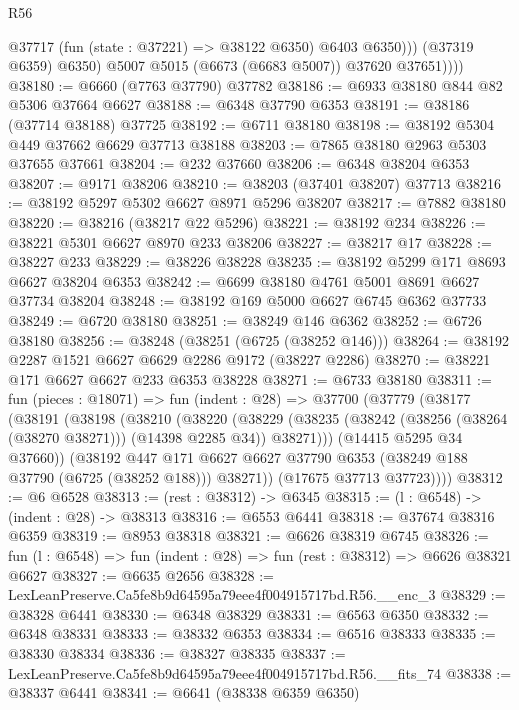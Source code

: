 \begin{lexlean}{R56}
\begin{coremodule}
                  @37717 (fun (state : @37221) => @38122 @6350) @6403 @6350)))
              (@37319 @6359)
              @6350)
            @5007
            @5015
            (@6673 (@6683 @5007))
            @37620
            @37651))))
@38180 := @6660 (@7763 @37790) @37782
@38186 := @6933 @38180 @844 @82 @5306 @37664 @6627
@38188 := @6348 @37790 @6353
@38191 := @38186 (@37714 @38188) @37725
@38192 := @6711 @38180
@38198 := @38192 @5304 @449 @37662 @6629 @37713 @38188
@38203 := @7865 @38180 @2963 @5303 @37655 @37661
@38204 := @232 @37660
@38206 := @6348 @38204 @6353
@38207 := @9171 @38206
@38210 := @38203 (@37401 @38207) @37713
@38216 := @38192 @5297 @5302 @6627 @8971 @5296 @38207
@38217 := @7882 @38180
@38220 := @38216 (@38217 @22 @5296)
@38221 := @38192 @234
@38226 := @38221 @5301 @6627 @8970 @233 @38206
@38227 := @38217 @17
@38228 := @38227 @233
@38229 := @38226 @38228
@38235 := @38192 @5299 @171 @8693 @6627 @38204 @6353
@38242 := @6699 @38180 @4761 @5001 @8691 @6627 @37734 @38204
@38248 := @38192 @169 @5000 @6627 @6745 @6362 @37733
@38249 := @6720 @38180
@38251 := @38249 @146 @6362
@38252 := @6726 @38180
@38256 := @38248 (@38251 (@6725 (@38252 @146)))
@38264 := @38192 @2287 @1521 @6627 @6629 @2286 @9172 (@38227 @2286)
@38270 := @38221 @171 @6627 @6627 @233 @6353 @38228
@38271 := @6733 @38180
@38311 := fun (pieces : @18071) =>
  fun (indent : @28) =>
  @37700
    (@37779
      (@38177
        (@38191
          (@38198
            (@38210
              (@38220
                (@38229
                  (@38235 (@38242 (@38256 (@38264 (@38270 @38271))) (@14398 @2285 @34)) @38271)))
              (@14415 @5295 @34 @37660))
            (@38192
              @447
              @171
              @6627
              @6627
              @37790
              @6353
              (@38249 @188 @37790 (@6725 (@38252 @188)))
              @38271))
          (@17675 @37713 @37723))))
@38312 := @6 @6528
@38313 := (rest : @38312) -> @6345
@38315 := (l : @6548) -> (indent : @28) -> @38313
@38316 := @6553 @6441
@38318 := @37674 @38316 @6359
@38319 := @8953 @38318
@38321 := @6626 @38319 @6745
@38326 := fun (l : @6548) => fun (indent : @28) => fun (rest : @38312) => @6626 @38321 @6627
@38327 := @6635 @2656
@38328 := LexLeanPreserve.Ca5fe8b9d64595a79eee4f004915717bd.R56.__enc_3
@38329 := @38328 @6441
@38330 := @6348 @38329
@38331 := @6563 @6350
@38332 := @6348 @38331
@38333 := @38332 @6353
@38334 := @6516 @38333
@38335 := @38330 @38334
@38336 := @38327 @38335
@38337 := LexLeanPreserve.Ca5fe8b9d64595a79eee4f004915717bd.R56.__fits_74
@38338 := @38337 @6441
@38341 := @6641 (@38338 @6359 @6350)

\end{coremodule}
\end{lexlean}
